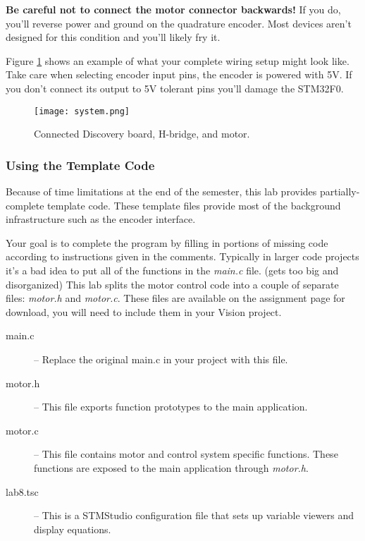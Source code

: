\documentclass[openany,11pt,fleqn]{book} %
\begin{document}
\begin{warning}
    \textbf{Be careful not to connect the motor connector backwards!} If you do, you'll reverse power and ground on the quadrature encoder. Most devices aren't designed for this condition and you'll likely fry it.
\end{warning}
Figure \ref{system} shows an example of what your complete wiring setup might look like. Take care when selecting encoder input pins, the encoder is powered with 5V. If you don't connect its output to 5V tolerant pins you'll damage the STM32F0.

\begin{figure}[tb]
    \centering\texttt{[image: system.png]}
    \caption{Connected Discovery board, H-bridge, and motor.}
    \label{system}
\end{figure}

\subsubsection{Using the Template Code}
Because of time limitations at the end of the semester, this lab provides partially-complete template code. These template files provide most of the background infrastructure such as the encoder interface.

Your goal is to complete the program by filling in portions of missing code according to instructions given in the comments. Typically in larger code projects it's a bad idea to put all of the functions in the \textit{main.c} file. (gets too big and disorganized) This lab splits the motor control code into a couple of separate files: \textit{motor.h} and \textit{motor.c}. These files are available on the assignment page for download, you will need to include them in your {\textmu}Vision project.

\begin{description}
    \item[main.c] -- Replace the original main.c in your project with this file.
    \item[motor.h] -- This file exports function prototypes to the main application.
    \item[motor.c] -- This file contains motor and control system specific functions. These functions are exposed to the main application through \textit{motor.h}. 
    \item[lab8.tsc] -- This is a STMStudio configuration file that sets up variable viewers and display equations.
\end{description}
\end{document}
